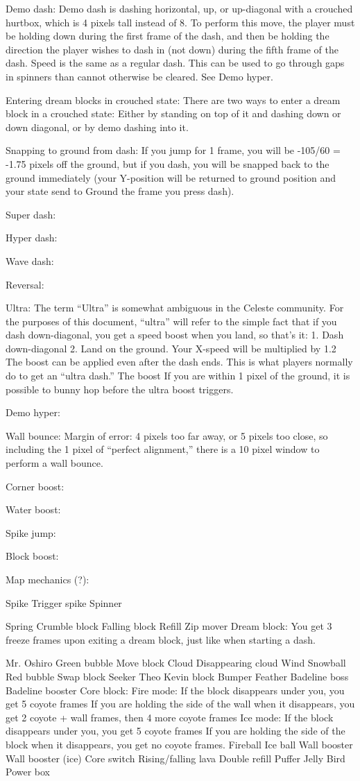 \documentclass[oneside]{book}
\begin{document}
Demo dash:
Demo dash is dashing horizontal, up, or up-diagonal with a crouched hurtbox, which is 4 pixels tall instead of 8. To perform this move, the player must be holding down during the first frame of the dash, and then be holding the direction the player wishes to dash in (not down) during the fifth frame of the dash. Speed is the same as a regular dash. This can be used to go through gaps in spinners than cannot otherwise be cleared. See Demo hyper.

Entering dream blocks in crouched state:
There are two ways to enter a dream block in a crouched state: Either by standing on top of it and dashing down or down diagonal, or by demo dashing into it. 

Snapping to ground from dash: If you jump for 1 frame, you will be -105/60 = -1.75 pixels off the ground, but if you dash, you will be snapped back to the ground immediately (your Y-position will be returned to ground position and your state send to Ground the frame you press dash).

Super dash:

Hyper dash:

Wave dash:

Reversal:

Ultra: The term “Ultra” is somewhat ambiguous in the Celeste community. For the purposes of this document, “ultra” will refer to the simple fact that if you dash down-diagonal, you get a speed boost when you land, so that's it:
1. Dash down-diagonal
2. Land on the ground. Your X-speed will be multiplied by 1.2
The boost can be applied even after the dash ends. This is what players normally do to get an “ultra dash.” The boost 
If you are within 1 pixel of the ground, it is possible to bunny hop before the ultra boost triggers.

Demo hyper:

Wall bounce:
Margin of error: 4 pixels too far away, or 5 pixels too close, so including the 1 pixel of “perfect alignment,” there is a 10 pixel window to perform a wall bounce.

Corner boost:

Water boost:

Spike jump:

Block boost:



Map mechanics  (?):

Spike
Trigger spike
Spinner

Spring
Crumble block
Falling block
Refill
Zip mover
Dream block:
You get 3 freeze frames upon exiting a dream block, just like when starting a dash.

Mr. Oshiro
Green bubble
Move block
Cloud
Disappearing cloud
Wind
Snowball
Red bubble
Swap block
Seeker
Theo
Kevin block
Bumper
Feather
Badeline boss
Badeline booster
Core block:
	Fire mode:
	If the block disappears under you, you get 5 coyote frames
	If you are holding the side of the wall when it disappears, you get 2 coyote + wall frames, then 	4 more coyote frames
	Ice mode:
	If the block disappears under you, you get 5 coyote frames
	If you are holding the side of the block when it disappears, you get no coyote frames.
Fireball
Ice ball
Wall booster
Wall booster (ice)
Core switch
Rising/falling lava
Double refill
Puffer
Jelly
Bird
Power box
\end{document}

